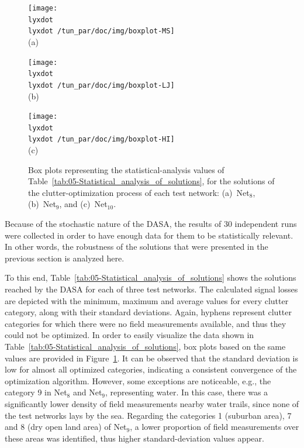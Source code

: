 \begin{figure}
\centering

\texttt{[image: \\lyxdot \\lyxdot /tun\_par/doc/img/boxplot-MS]}\\\hspace*{0.2in}(a)

\texttt{[image: \\lyxdot \\lyxdot /tun\_par/doc/img/boxplot-LJ]}\\\hspace*{0.2in}(b)

\texttt{[image: \\lyxdot \\lyxdot /tun\_par/doc/img/boxplot-HI]}\\\hspace*{0.2in}(c)

\caption{Box plots representing the statistical-analysis values of Table~\ref{tab:05-Statistical_analysis_of_solutions},
for the solutions of the clutter-optimization process of each test
network: (a)~Net$_{8}$, (b)~Net$_{9}$, and (c)~Net$_{10}$.\label{fig:05-Statistical_analysis_boxplots}}
\end{figure}


\bigskip{}


Because of the stochastic nature of the DASA, the results of 30 independent
runs were collected in order to have enough data for them to be statistically
relevant. In other words, the robustness of the solutions that were
presented in the previous section is analyzed here.

To this end, Table~\ref{tab:05-Statistical_analysis_of_solutions}
shows the solutions reached by the DASA for each of three test networks.
The calculated signal losses are depicted with the minimum, maximum
and average values for every clutter category, along with their standard
deviations. Again, hyphens represent clutter categories for which
there were no field measurements available, and thus they could not
be optimized. In order to easily visualize the data shown in Table~\ref{tab:05-Statistical_analysis_of_solutions},
box plots based on the same values are provided in Figure~\ref{fig:05-Statistical_analysis_boxplots}.
It can be observed that the standard deviation is low for almost all
optimized categories, indicating a consistent convergence of the optimization
algorithm. However, some exceptions are noticeable, e.g., the category
9 in Net$_{8}$ and Net$_{9}$, representing water. In this case,
there was a significantly lower density of field measurements nearby
water trails, since none of the test networks lays by the sea. Regarding
the categories 1 (suburban area), 7 and 8 (dry open land area) of
Net$_{9}$, a lower proportion of field measurements over these areas
was identified, thus higher standard-deviation values appear.

